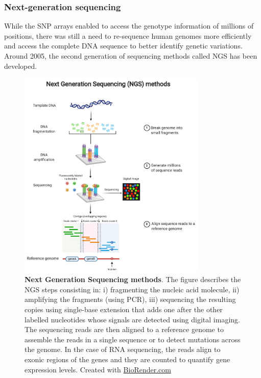 \subsubsection*{Next-generation sequencing}
While the \gls*{SNP} arrays enabled to access the genotype information of millions of positions, there was still a need to re-sequence human genomes more efficiently and access the complete \gls*{DNA} sequence to better identify genetic variations. Around 2005, the second generation of sequencing methods called \gls{NGS} has been developed. 
\begin{figure}[H]
    \centering
    \includegraphics[width=0.8\textwidth]{Figures/Intro/ngs.pdf}
    \caption[Next Generation Sequencing methods]{\textbf{Next Generation Sequencing methods}. The figure describes the \gls{NGS} steps consisting in: i) fragmenting the nucleic acid molecule, ii) amplifying the fragments (using \gls{PCR}), iii) sequencing the resulting copies using single-base extension that adds one after the other labelled nucleotides whose signals are detected using digital imaging. The sequencing reads are then aligned to a reference genome to assemble the reads in a single sequence or to detect mutations across the genome. In the case of \gls*{RNA} sequencing, the reads align to exonic regions of the genes and they are counted to quantify gene expression levels. Created with \href{https://biorender.com/}{BioRender.com}}
    \label{fig:intro_ngs}
\end{figure}
